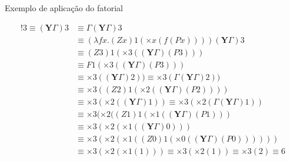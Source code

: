 \begin{frame}[fragile]{Exemplo de aplicação do fatorial}

    \begin{align*}
        !3 \equiv (\mathbf{Y}\Gamma )3 &\equiv \Gamma (\mathbf{Y}\Gamma )3 \\
        &\equiv (\lambda fx.(Zx)1(\times x(f(Px))))(\mathbf{Y}\Gamma )3 \\
        &\equiv (Z3)1(\times 3((\mathbf{Y}\Gamma )(P3))) \\
        &\equiv F1(\times 3((\mathbf{Y}\Gamma )(P3))) \\
        &\equiv \times 3((\mathbf{Y}\Gamma )2)) \equiv \times 3(\Gamma (\mathbf{Y}\Gamma )2)) \\
        &\equiv \times 3((Z2)1(\times 2((\mathbf{Y}\Gamma )(P2)))) \\
        &\equiv \times 3(\times 2((\mathbf{Y}\Gamma )1)) \equiv \times 3(\times 2(\Gamma (\mathbf{Y}\Gamma )1)) \\
        &\equiv \times 3(\times 2((Z1)1(\times 1((\mathbf{Y}\Gamma )(P1))) \\
        &\equiv \times 3(\times 2(\times 1((\mathbf{Y}\Gamma )0))) \\
        &\equiv \times 3(\times 2(\times 1((Z0)1(\times 0((\mathbf{Y}\Gamma )(P0)))))) \\
        &\equiv \times 3(\times 2(\times 1(1))) \equiv \times 3(\times 2(1)) \equiv \times 3(2) \equiv 6
    \end{align*}

\end{frame}
